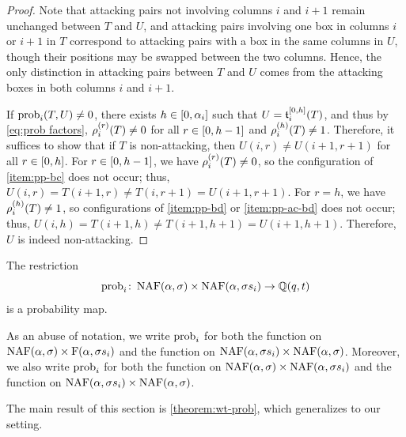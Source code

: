 \begin{proof}
	Note that attacking pairs not involving columns \(i\) and \(i+1\)
	remain unchanged between \(T\) and \(U\),
	and attacking pairs involving one box in columns \(i\) or \(i+1\) in \(T\)
	correspond to attacking pairs with a box in the same columns in \(U\),
	though their positions may be swapped between the two columns.
	Hence,
	the only distinction in attacking pairs between \(T\) and \(U\)
	comes from the attacking boxes in both columns \(i\) and \(i+1\).

	If \(\prob{i}(T, U) \neq 0\),
	there exists \(h \in \interval{0, \alpha_i}\) such that \(U = \sswap[0, h]{i}(T)\),
	and thus by \eqref{eq:prob factors},
	\(\pp[r]{i}(T) \neq 0\) for all \(r \in \interval{0, h-1}\) and \(\pp[h]{i}(T) \neq 1\).
	Therefore,
	it suffices to show that if \(T\) is non-attacking,
	then \(U(i, r) \neq U(i+1, r+1)\) for all \(r \in \interval{0, h}\).
	For \(r \in \interval{0, h-1}\),
	we have \(\pp[r]{i}(T) \neq 0\), so the configuration of \cref{item:pp-bc} does not occur;
	thus, \(U(i, r) = T(i+1, r) \neq T(i, r+1) = U(i+1, r+1)\).
	For \(r = h\),
	we have \(\pp[h]{i}(T) \neq 1\),
	so configurations of \cref{item:pp-bd} or \cref{item:pp-ac-bd} does not occur;
	thus, \(U(i, h) = T(i+1, h) \neq T(i+1, h+1) = U(i+1, h+1)\).
	Therefore, \(U\) is indeed non-attacking.
\end{proof}

\begin{corollary}
	The restriction
	\begin{equation*}
		\prob{i} \colon \NAF(\alpha, \sigma) \times \NAF(\alpha, \sigma s_i) \to \rationals(q, t)
	\end{equation*}
	is a probability map.
\end{corollary}

As an abuse of notation, we write \(\prob{i}\) for both
the function on \(\NAF(\alpha, \sigma) \times \Fill(\alpha, \sigma s_i)\) and
the function on \(\NAF(\alpha, \sigma s_i) \times \NAF(\alpha, \sigma)\).
Moreover, we also write \(\prob{i}\) for both
the function on \(\NAF(\alpha, \sigma) \times \NAF(\alpha, \sigma s_i)\) and
the function on \(\NAF(\alpha, \sigma s_i) \times \NAF(\alpha, \sigma)\).

The main result of this section is \cref{theorem:wt-prob},
which generalizes \cite[Lemma 4.4]{Man24} to our setting.


